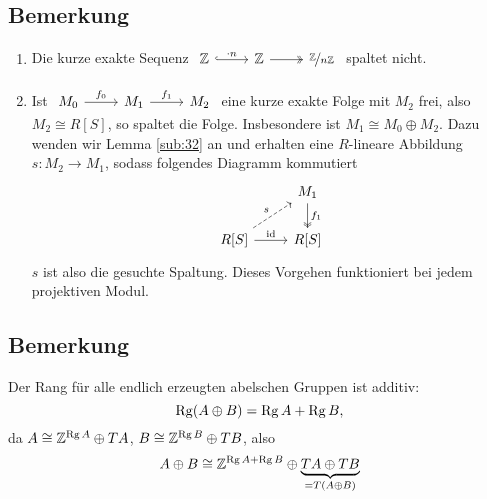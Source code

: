 \subsection[Bemerkung: Existenz einer Spaltung, wenn $M_2$ frei ist]{Bemerkung} %
\label{sub:46}
\begin{enumerate}[1)]
	\item Die kurze exakte Sequenz $\begin{tikzcd}
		\mathds{Z} \rar[hook,"\cdot n"] & \mathds{Z} \rar[two heads] &  \nicefrac{\mathds{Z}}{n \mathds{Z}}
	\end{tikzcd}$
	spaltet nicht.
	\item Ist $\begin{tikzcd}
		M_0 \rar["f_0"] & M_1 \rar["f_1"] & M_2
	\end{tikzcd}$
	eine kurze exakte Folge mit $M_2$ frei, also $M_2 \cong R[S]$, so spaltet die Folge.
	Insbesondere ist $M_1 \cong M_0 \oplus M_2$.
	Dazu wenden wir Lemma \ref{sub:32} an und erhalten eine $R$-lineare Abbildung $s \colon M_2 \to M_1$, sodass folgendes Diagramm kommutiert
	\[
		\begin{tikzcd}
			\mbox{ } & M_1 \dar["f_1",two heads] \\
			R[S] \urar["s", dashed] \rar["\id"] &  R[S]
		\end{tikzcd}
	\]
	$s$ ist also die gesuchte Spaltung.
	Dieses Vorgehen funktioniert bei jedem projektiven Modul.
\end{enumerate}

\subsection[Bemerkung: Der Rang ist additiv]{Bemerkung} %
\label{sub:47}
Der Rang für alle endlich erzeugten abelschen Gruppen ist additiv:
\[
	\operatorname{Rg}(A \oplus B) =\operatorname{Rg} A + \operatorname{Rg} B,
\]
da $A \cong \mathbb{Z}^{\operatorname{Rg} A} \oplus T A$, $B \cong \mathbb{Z}^{\operatorname{Rg} B} \oplus TB$, also 
\[
	A \oplus B \cong \mathbb{Z}^{\operatorname{Rg} A + \operatorname{Rg} B} \oplus \underbrace{T A \oplus T B}_{=T(A \oplus B)}
\]


